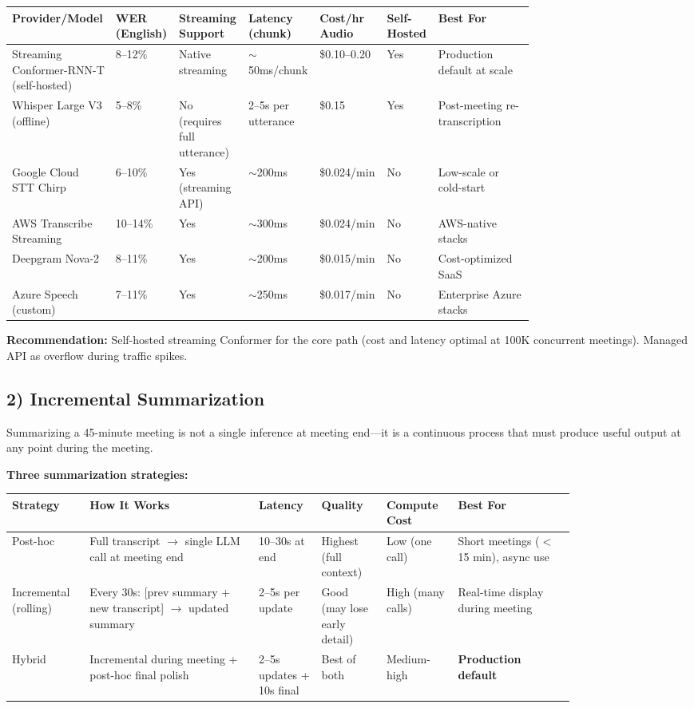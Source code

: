 \begin{tabular}{|p{0.18\linewidth}|p{0.07\linewidth}|p{0.09\linewidth}|p{0.08\linewidth}|p{0.09\linewidth}|p{0.07\linewidth}|p{0.18\linewidth}|}
\hline
\textbf{Provider/Model} & \textbf{WER (English)} & \textbf{Streaming Support} & \textbf{Latency (chunk)} & \textbf{Cost/hr Audio} & \textbf{Self-Hosted} & \textbf{Best For} \\
\hline
Streaming Conformer-RNN-T (self-hosted) & 8--12\% & Native streaming & $\sim$50ms/chunk & \$0.10--0.20 & Yes & Production default at scale \\
\hline
Whisper Large V3 (offline) & 5--8\% & No (requires full utterance) & 2--5s per utterance & \$0.15 & Yes & Post-meeting re-transcription \\
\hline
Google Cloud STT Chirp & 6--10\% & Yes (streaming API) & $\sim$200ms & \$0.024/min & No & Low-scale or cold-start \\
\hline
AWS Transcribe Streaming & 10--14\% & Yes & $\sim$300ms & \$0.024/min & No & AWS-native stacks \\
\hline
Deepgram Nova-2 & 8--11\% & Yes & $\sim$200ms & \$0.015/min & No & Cost-optimized SaaS \\
\hline
Azure Speech (custom) & 7--11\% & Yes & $\sim$250ms & \$0.017/min & No & Enterprise Azure stacks \\
\hline
\end{tabular}

\textbf{Recommendation:} Self-hosted streaming Conformer for the core path (cost and latency optimal at 100K concurrent meetings). Managed API as overflow during traffic spikes.

\subsection*{2) Incremental Summarization}

Summarizing a 45-minute meeting is not a single inference at meeting end---it is a continuous process that must produce useful output at any point during the meeting.

\textbf{Three summarization strategies:}

\begin{tabular}{|p{0.10\linewidth}|p{0.26\linewidth}|p{0.08\linewidth}|p{0.10\linewidth}|p{0.10\linewidth}|p{0.18\linewidth}|}
\hline
\textbf{Strategy} & \textbf{How It Works} & \textbf{Latency} & \textbf{Quality} & \textbf{Compute Cost} & \textbf{Best For} \\
\hline
Post-hoc & Full transcript $\rightarrow$ single LLM call at meeting end & 10--30s at end & Highest (full context) & Low (one call) & Short meetings ($<$15 min), async use \\
\hline
Incremental (rolling) & Every 30s: [prev summary + new transcript] $\rightarrow$ updated summary & 2--5s per update & Good (may lose early detail) & High (many calls) & Real-time display during meeting \\
\hline
Hybrid & Incremental during meeting + post-hoc final polish & 2--5s updates + 10s final & Best of both & Medium-high & \textbf{Production default} \\
\hline
\end{tabular}


